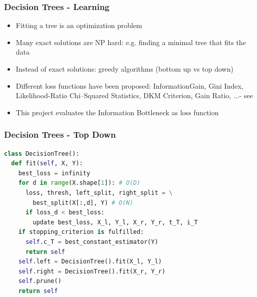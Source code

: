 \begin{frame}
   \frametitle{Decision Trees - Learning}  
   \begin{itemize}
   \item Fitting a tree is an optimization problem
   \item Many exact solutions are NP hard: e.g. finding a minimal tree that fits the data
   \item Instead of exact solutions: greedy algorithms (bottom up vs top down)
   \item Different loss functions have been proposed: \newline
   InformationGain, Gini Index,  Likelihood-Ratio Chi–Squared Statistics, DKM Criterion, Gain Ratio, ...- see \cite{rokach_decision_2005}
   \item This project evaluates the Information Bottleneck as loss function 
   \end{itemize}
\end{frame}



\begin{frame}[fragile]
   \frametitle{Decision Trees - Top Down}  
   \begin{lstlisting}[language=Python, basicstyle=\small]
class DecisionTree():
  def fit(self, X, Y):
    best_loss = infinity
    for d in range(X.shape[1]): # O(D) 
      loss, thresh, left_split, right_split = \
        best_split(X[:,d], Y) # O(N)
      if loss_d < best_loss:
        update best_loss, X_l, Y_l, X_r, Y_r, t_T, i_T
    if stopping_criterion is fulfilled:
      self.c_T = best_constant_estimator(Y)
      return self
    self.left = DecisionTree().fit(X_l, Y_l)
    self.right = DecisionTree().fit(X_r, Y_r)
    self.prune()
    return self
\end{lstlisting}

\end{frame}